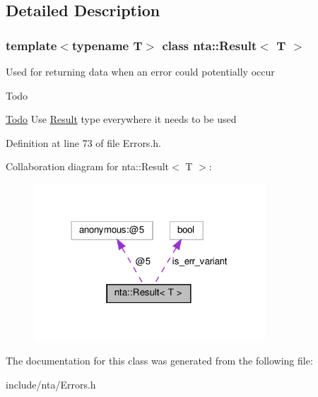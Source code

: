 \subsection{Detailed Description}
\subsubsection*{template$<$typename T$>$\newline
class nta\+::\+Result$<$ T $>$}

Used for returning data when an error could potentially occur \begin{DoxyRefDesc}{Todo}
\item[\hyperlink{todo__todo000003}{Todo}]Use \hyperlink{classnta_1_1Result}{Result} type everywhere it needs to be used \end{DoxyRefDesc}


Definition at line 73 of file Errors.\+h.



Collaboration diagram for nta\+:\+:Result$<$ T $>$\+:
\nopagebreak
\begin{figure}[H]
\begin{center}
\leavevmode
\includegraphics[width=246pt]{d6/da5/classnta_1_1Result__coll__graph}
\end{center}
\end{figure}


The documentation for this class was generated from the following file\+:\begin{DoxyCompactItemize}
\item 
include/nta/Errors.\+h\end{DoxyCompactItemize}
